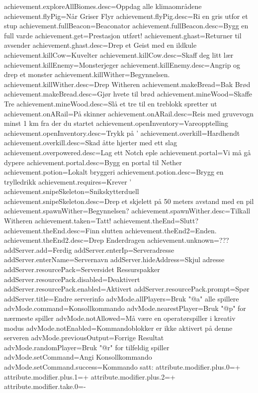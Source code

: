 achievement.exploreAllBiomes.desc=Oppdag alle klimaområdene
achievement.flyPig=Når Griser Flyr
achievement.flyPig.desc=Ri en gris utfor et stup
achievement.fullBeacon=Beaconator
achievement.fullBeacon.desc=Bygg en full varde
achievement.get=Prestasjon utført!
achievement.ghast=Returner til avsender
achievement.ghast.desc=Drep et Geist med en ildkule
achievement.killCow=Kuvelter
achievement.killCow.desc=Skaff deg litt lær
achievement.killEnemy=Monsterjeger
achievement.killEnemy.desc=Angrip og drep et monster
achievement.killWither=Begynnelsen.
achievement.killWither.desc=Drep Witheren
achievement.makeBread=Bak Brød
achievement.makeBread.desc=Gjør hvete til brød
achievement.mineWood=Skaffe Tre
achievement.mineWood.desc=Slå et tre til en treblokk spretter ut
achievement.onARail=På skinner
achievement.onARail.desc=Reis med gruvevogn minst 1 km fra der du startet
achievement.openInventory=Vareopptelling
achievement.openInventory.desc=Trykk på '%
achievement.overkill=Hardhendt
achievement.overkill.desc=Skad åtte hjerter med ett slag
achievement.overpowered.desc=Lag ett Notch eple
achievement.portal=Vi må gå dypere
achievement.portal.desc=Bygg en portal til Nether
achievement.potion=Lokalt bryggeri
achievement.potion.desc=Brygg en trylledrikk
achievement.requires=Krever '%
achievement.snipeSkeleton=Snikskytterduell
achievement.snipeSkeleton.desc=Drep et skjelett på 50 meters avstand med en pil
achievement.spawnWither=Begynnelsen?
achievement.spawnWither.desc=Tilkall Witheren
achievement.taken=Tatt!
achievement.theEnd=Slutt?
achievement.theEnd.desc=Finn slutten
achievement.theEnd2=Enden.
achievement.theEnd2.desc=Drep Enderdragen
achievement.unknown=???
addServer.add=Ferdig
addServer.enterIp=Serveradresse
addServer.enterName=Servernavn
addServer.hideAddress=Skjul adresse
addServer.resourcePack=Serversidet Ressurspakker
addServer.resourcePack.disabled=Deaktivert
addServer.resourcePack.enabled=Aktivert
addServer.resourcePack.prompt=Spør
addServer.title=Endre serverinfo
advMode.allPlayers=Bruk "@a" alle spillere
advMode.command=Konsollkommando
advMode.nearestPlayer=Bruk "@p" for nærmeste spiller
advMode.notAllowed=Må være en operatørspiller i kreativ modus
advMode.notEnabled=Kommandoblokker er ikke aktivert på denne serveren
advMode.previousOutput=Forrige Resultat
advMode.randomPlayer=Bruk "@r" for tilfeldig spiller
advMode.setCommand=Angi Konsollkommando
advMode.setCommand.success=Kommando satt: %
attribute.modifier.plus.0=+%
attribute.modifier.plus.1=+%
attribute.modifier.plus.2=+%
attribute.modifier.take.0=-%
